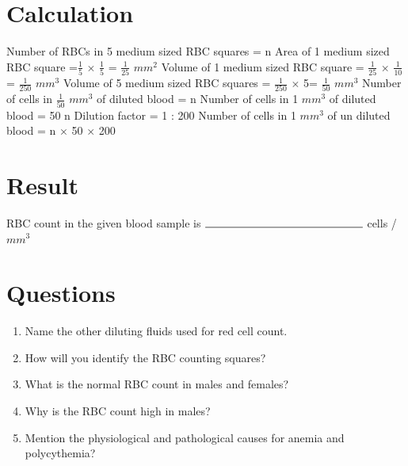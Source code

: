 \documentclass[a4paper,12pt,openany,oneside]{book}
\begin{document}
					\section*{Calculation}
					Number of RBCs in 5 medium sized RBC squares = n\newline\vspace{.4cm}
					Area of 1 medium  sized RBC square =$\frac{1}{5}$ $\times$ $\frac{1}{5}$ = $\frac{1}{25}$ $mm^2$\newline\vspace{.4cm}
					Volume of 1 medium sized RBC square = $\frac{1}{25}$ $\times$ $\frac{1}{10}$ = $\frac{1}{250}$ $mm^3$\newline\vspace{.4cm}
					Volume of 5 medium sized RBC squares = $\frac{1}{250}$ $\times$ 5= $\frac{1}{50}$ $mm^3$\newline\vspace{.4cm}
					Number of cells in  $\frac{1}{50}$ $mm^3$ of diluted blood  = n\newline\vspace{.4cm}
					Number of cells in  1 $mm^3$  of diluted blood = 50 n\newline\vspace{.4cm}
					Dilution factor = 1 : 200\newline\vspace{.4cm}
					Number of cells in 1 $mm^3$ of un diluted blood 	= n $\times$ 50 $\times$ 200  \newline\vspace{.4cm}

					\section*{Result}
					RBC  count in the given  blood sample is $\rule{5cm}{0.5pt}$ cells / $mm^3$
					\section*{Questions}
					\begin{enumerate}

						\item {Name the other diluting fluids used for red  cell count.}
						\item{How will you identify the RBC counting squares?}
						\item{What is the normal RBC count in males and females?}
						\item{Why is the RBC count high in males?}
						\item{Mention the physiological and pathological causes for anemia and polycythemia?}


					\end{enumerate}
\end{document}
